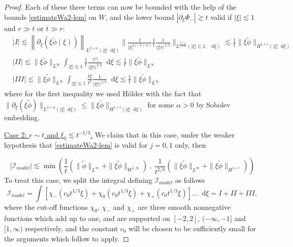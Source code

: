 \documentclass[11 pt]{amsart}
\theoremstyle{definition}
\theoremstyle{remark}
\numberwithin{equation}{section}
\newcommand{\dd}{\mathop{}\!\mathrm{d}}
\begin{document}
\begin{proof}
Each of these three terms can now be bounded with the help of the bounds \eqref{estimateWa2-lem} on $W$, and the lower bound $|\partial_\xi \Phi_- | \gtrsim t$ valid if $|\xi| \lesssim 1$ and $r \gg t$ or $t \gg r$:
\begin{align*}
& |I| \lesssim \left\| \partial_\xi (\xi \widetilde{\phi}(\xi))\right\|_{L^{2+\alpha}(|\xi|\dd \xi)} \| \frac{1}{|\xi|^{1/(2+\alpha)}}\frac 1t \frac{1}{\langle \xi r \rangle^{1/2}}\|_{L^{\frac{2+\alpha}{1+\alpha}}(|\xi|\lesssim 1, \ \dd \xi)} \lesssim \frac{1}{t} \| \xi \tilde \phi\|_{H^{1+\epsilon}(|\xi|\dd \xi)} \\
& |II| \lesssim \| \xi \widetilde{\phi} \|_{L^\infty} \int_{|\xi|\lesssim 1} \frac 1t \frac{\langle r \rangle}{\langle \xi r \rangle^{3/2}} \dd \xi \lesssim \frac 1t \| \xi \widetilde{\phi} \|_{L^\infty}  \\
& |III| \lesssim \| \xi \widetilde{\phi} \|_{L^\infty} \int_{|\xi| \lesssim 1} \frac{t\xi}{t^2} \frac{1}{\langle \xi r \rangle^{1/2}} \dd \xi \lesssim \frac{1}{t} \| \xi \widetilde{\phi} \|_{L^\infty}
\end{align*}
where for the first inequality we used H\"older with the fact that $\| \partial_\xi (\xi \tilde \phi)\|_{L^{2+\alpha}(|\xi|\dd \xi)}\leq \| \xi \tilde \phi\|_{H^{1+\epsilon}(|\xi|\dd \xi)}$ for some $\alpha>0$ by Sobolev embedding.

\medskip

\noindent \underline{Case 2: $r \sim t$ and $\xi_0 \lesssim t^{-1/3}$.} We claim that in this case, under the weaker hypothesis that \eqref{estimateWa2-lem} is valid for $j=0,1$ only, then

\begin{equation} \label{estimation-model-integral-case2}
|\mathcal{I}_{model} |\lesssim \min \left( \frac{1}{t}\left( \| \widetilde{\phi} \|_{L^\infty} + \| \xi \widetilde{\phi} \|_{W^{1,\infty}} \right) \ , \ \frac{1}{t^{2/3}}\left( \| \xi \widetilde{\phi} \|_{L^\infty} + \| \xi \widetilde{\phi} \|_{H^{1+\epsilon}} \right) \right)
\end{equation}
To treat this case, we split the integral defining $\mathcal{I}_{model}$ as follows
$$
\mathcal{I}_{model} = \int \left[ \chi_-(c_0 t^{1/3} \xi) + \chi_0(c_0 t^{1/3} \xi) + \chi_+(c_0 t^{1/3} \xi) \right] \dots \dd \xi = I + II + III,
$$
where the cut-off functions $\chi_0$, $\chi_-$ and $\chi_+$ are three smooth nonnegative functions which add up to one, and are supported on $[-2,2]$, $(-\infty,-1]$ and $[1,\infty)$ respectively, and the constant $c_0$ will be chosen to be sufficiently small for the arguments which follow to apply.


\end{proof}
\end{document}
